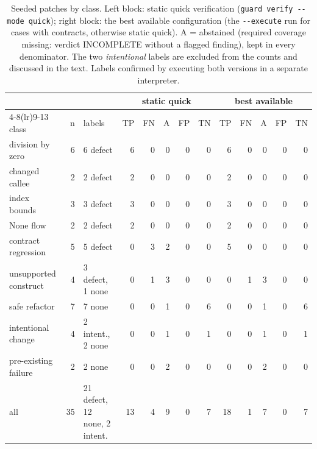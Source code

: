 \begin{table}[t]
\centering
\small

\caption{Seeded patches by class. Left block: static quick verification (\texttt{guard verify -{}-mode quick}); right block: the best available configuration (the \texttt{-{}-execute} run for cases with contracts, otherwise static quick). A = abstained (required coverage missing: verdict INCOMPLETE without a flagged finding), kept in every denominator. The two \emph{intentional} labels are excluded from the counts and discussed in the text. Labels confirmed by executing both versions in a separate interpreter.}
\label{tab:seeded-classes}
\begin{tabular}{lrlrrrrrrrrrr}
\toprule
 & & & \multicolumn{5}{c}{static quick} & \multicolumn{5}{c}{best available} \\ \cmidrule(lr){4-8}\cmidrule(lr){9-13}
class & n & labels & TP & FN & A & FP & TN & TP & FN & A & FP & TN \\
\midrule
division by zero & 6 & 6 defect & 6 & 0 & 0 & 0 & 0 & 6 & 0 & 0 & 0 & 0 \\
changed callee & 2 & 2 defect & 2 & 0 & 0 & 0 & 0 & 2 & 0 & 0 & 0 & 0 \\
index bounds & 3 & 3 defect & 3 & 0 & 0 & 0 & 0 & 3 & 0 & 0 & 0 & 0 \\
None flow & 2 & 2 defect & 2 & 0 & 0 & 0 & 0 & 2 & 0 & 0 & 0 & 0 \\
contract regression & 5 & 5 defect & 0 & 3 & 2 & 0 & 0 & 5 & 0 & 0 & 0 & 0 \\
unsupported construct & 4 & 3 defect, 1 none & 0 & 1 & 3 & 0 & 0 & 0 & 1 & 3 & 0 & 0 \\
safe refactor & 7 & 7 none & 0 & 0 & 1 & 0 & 6 & 0 & 0 & 1 & 0 & 6 \\
intentional change & 4 & 2 intent., 2 none & 0 & 0 & 1 & 0 & 1 & 0 & 0 & 1 & 0 & 1 \\
pre-existing failure & 2 & 2 none & 0 & 0 & 2 & 0 & 0 & 0 & 0 & 2 & 0 & 0 \\
\midrule
all & 35 & 21 defect, 12 none, 2 intent. & 13 & 4 & 9 & 0 & 7 & 18 & 1 & 7 & 0 & 7 \\
\bottomrule
\end{tabular}
\end{table}
